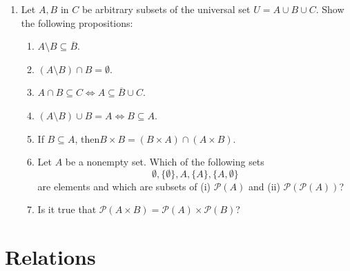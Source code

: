 \documentclass[11pt,paper=b5,footinclude,headinclude]{scrbook} %
\theoremstyle{remark}
\theoremstyle{definition} %
\theoremstyle{theorem} %
\begin{document}
\begin{enumerate}
\item Let $A, B$ in $C$ be arbitrary subsets of the universal set $U= A \cup B \cup C$. Show the following propositions:
\begin{enumerate}
\item  $A\setminus B \subseteq \overline{B}$.
\item  $(A\setminus B)\cap B = \emptyset $.
\item  $A\cap B \subseteq C \Leftrightarrow A\subseteq \overline{B} \cup C$.
\item  $(A\setminus B) \cup B = A \Leftrightarrow B \subseteq A$.
\item  If $B\subseteq A$, then$B\times B = (B\times A)\cap (A\times B)$.
\item Let $A$ be a nonempty set. Which of the following sets 
$$\emptyset,\{\emptyset\}, A, \{A\}, \{A,\emptyset\}$$
are elements and which are subsets of (i) $\mathcal{P}(A)$ and (ii) $\mathcal{P}(\mathcal{P}(A))$?
\item  Is it true that  $\mathcal{P}(A\times B) = \mathcal{P}(A) \times \mathcal{P}(B)$?
\end{enumerate}


\end{enumerate}



\chapter{Relations}
\end{document}
